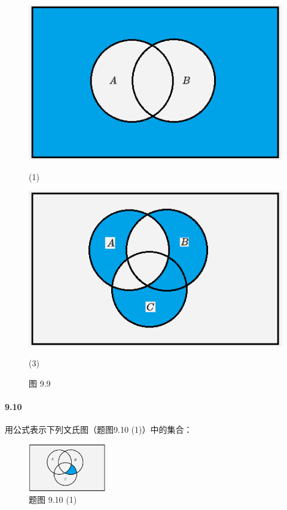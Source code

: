 \documentclass[UTF8]{ctexart}
\begin{document}
\begin{figure}[!htb]
    \centering
    \begin{minipage}[t]{0.305\textwidth}
    \centering
    \includegraphics[width=1\textwidth]{9-9-1.png}
    \caption*{(1)}
    \end{minipage}
    \begin{minipage}[t]{0.305\textwidth}
    \centering
    \includegraphics[width=1\textwidth]{9-9-3.png}
    \caption*{(3)}
    \end{minipage}
    \caption*{图 9.9}
\end{figure}    

\paragraph{9.10}\label{9.10}
用公式表示下列文氏图（题图9.10 (1)）中的集合：

\begin{figure}[!htb]
    \centering
    \includegraphics[width=0.305\textwidth]{9-10-1.png}
    \caption*{题图 9.10 (1)}
\end{figure}    
\end{document}
